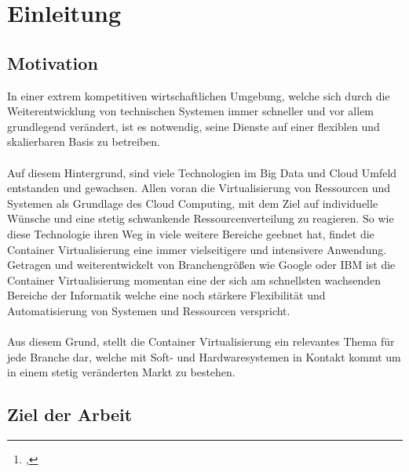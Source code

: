 \documentclass[12pt,toc=bib,toc=listof]{scrreprt}
\title{\ebttopic}
\author{\ebtstudentname\footnote{\ebtstudentid, \ebtstudentmail}}
\begin{document}
\maketitle
\tableofcontents



\listoffigures

\onehalfspacing
\newpage
{}

\chapter{Einleitung} %
\label{sec:einleitung}

\section{Motivation} %
\label{sec:motivation}

In einer extrem kompetitiven wirtschaftlichen Umgebung, welche sich durch die Weiterentwicklung von technischen Systemen immer schneller und vor allem grundlegend verändert,
ist es notwendig, seine Dienste auf einer flexiblen und skalierbaren Basis zu betreiben.\\
\\
Auf diesem Hintergrund, sind viele Technologien im Big Data und Cloud Umfeld entstanden und gewachsen.
Allen voran die Virtualisierung von Ressourcen und Systemen als Grundlage des Cloud Computing, mit dem Ziel auf individuelle Wünsche und eine stetig schwankende Ressourcenverteilung zu reagieren.
So wie diese Technologie ihren Weg in viele weitere Bereiche geebnet hat, findet die Container Virtualisierung eine immer vielseitigere und intensivere Anwendung.
Getragen und weiterentwickelt von Branchengrößen wie Google oder IBM ist die Container Virtualisierung momentan eine der sich am schnellsten wachsenden Bereiche der Informatik welche eine noch stärkere Flexibilität und Automatisierung von Systemen und Ressourcen verspricht.\\
\\
Aus diesem Grund, stellt die Container Virtualisierung ein relevantes Thema für jede Branche dar, welche mit Soft- und Hardwaresystemen in Kontakt kommt um in einem stetig veränderten Markt zu bestehen.



\section{Ziel der Arbeit} %
\label{sec:ziel_der_arbeit}
\end{document}
